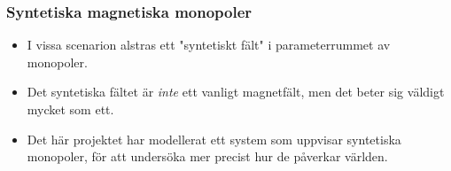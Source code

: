 \documentclass[aspectratio=169]{beamer}
\begin{document}
\begin{frame}
        \frametitle{Syntetiska magnetiska monopoler}
        \begin{itemize}
                \item I vissa scenarion alstras ett
                        "syntetiskt fält" i
                        parameterrummet av monopoler.
                \item Det syntetiska fältet är
                        \textit{inte} ett vanligt
                        magnetfält, men det beter sig
                        väldigt mycket som ett.
                \item Det här projektet har modellerat
                        ett system som uppvisar
                        syntetiska monopoler, för att
                        undersöka mer precist hur de
                        påverkar världen.
        \end{itemize}
\end{frame}
\end{document}
